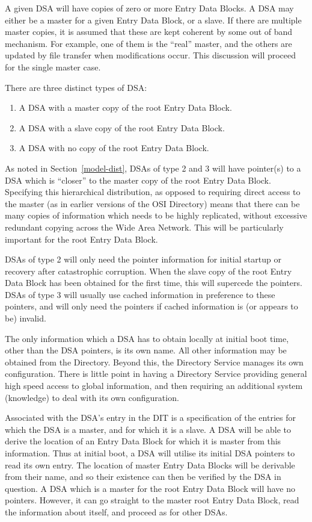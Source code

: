 A given DSA will have copies of zero or more Entry Data Blocks.
A DSA may either be a master for a given Entry Data Block, or a
slave.
If there are multiple master copies, it is assumed that these
are kept coherent by some out of band mechanism.
For example, one of them is the ``real'' master, and the others
are updated by file transfer when modifications occur.
This discussion will proceed for the single master case.

There are three distinct types of DSA:

\begin {enumerate}
\item 
A DSA with a master copy of the root Entry Data Block.
\item 
A DSA with a slave copy of the root Entry Data Block.
\item 
A DSA with no copy of the root Entry Data Block.
\end {enumerate}

As noted in Section~\ref{model-dist}, DSAs of type 2 and 3 will have pointer(s) to
a DSA which is ``closer'' to the master copy of the root Entry
Data Block.
Specifying this hierarchical distribution, as opposed to requiring
direct access to the master (as in earlier versions of the OSI Directory)
means that there can be many copies of information which needs to be highly
replicated, without excessive
redundant copying across the Wide Area Network.   
This will be particularly important for the root Entry Data Block.

DSAs of type 2 will only need the pointer information for initial
startup or recovery after catastrophic corruption.
When the slave copy of the root Entry Data Block has been
obtained for the first time, this will supercede the pointers.
DSAs of type 3 will usually use cached information in preference to
these pointers, and will only need the pointers if cached information is
(or appears to be) invalid.

The only information which a DSA has to obtain locally at initial boot time,
other than the DSA pointers, is its own name.  All other information may be
obtained from the Directory.
Beyond this, the Directory Service manages its own
configuration.
There is little point in having a Directory Service providing
general high speed access to global information, and then
requiring an additional system (knowledge) to deal with its own
configuration.

Associated with the DSA's entry in the DIT is a specification of
the entries for which the DSA is a master, and for which it is
a slave.
A DSA will be able to derive the location of an Entry Data
Block for which it is master from this information.
Thus at initial boot, a DSA will utilise its initial DSA pointers
to read its own entry.
The location of master Entry Data Blocks will be derivable from
their name, and so their existence can then be verified by the
DSA in question.
A DSA which is a master for the root Entry Data Block will have
no pointers.
However, it can go straight to the master root Entry Data
Block, read the information about itself, and proceed as for
other DSAs.


